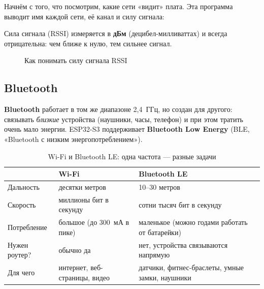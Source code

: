Начнём с того, что посмотрим, какие сети «видит» плата. Эта программа выводит имя каждой сети,
её канал и силу сигнала:


Сила сигнала (RSSI) измеряется в \textbf{дБм} (децибел-милливаттах) и всегда отрицательна: чем
ближе к нулю, тем сильнее сигнал.

\begin{figure}[H]
\centering
{}
\caption{Как понимать силу сигнала RSSI}
\end{figure}

\subsection{Bluetooth}

\textbf{Bluetooth} работает в том же диапазоне 2,4~ГГц, но создан для другого: связывать
\emph{близкие} устройства (наушники, часы, телефон) и при этом тратить очень мало энергии.
ESP32-S3 поддерживает \textbf{Bluetooth Low Energy} (BLE, «Bluetooth с низким энергопотреблением»).

\begin{table}[H]
\centering\small
\begin{tabularx}{\textwidth}{@{}l X X@{}}
\toprule
 & \textbf{Wi-Fi} & \textbf{Bluetooth LE}\\
\midrule
Дальность & десятки метров & 10--30 метров\\
Скорость & миллионы бит в секунду & сотни тысяч бит в секунду\\
Потребление & большое (до 300~мА в пике) & маленькое (можно годами работать от батарейки)\\
Нужен роутер? & обычно да & нет, устройства связываются напрямую\\
Для чего & интернет, веб-страницы, видео & датчики, фитнес-браслеты, умные замки, наушники\\
\bottomrule
\end{tabularx}
\caption{Wi-Fi и Bluetooth LE: одна частота --- разные задачи}
\end{table}

